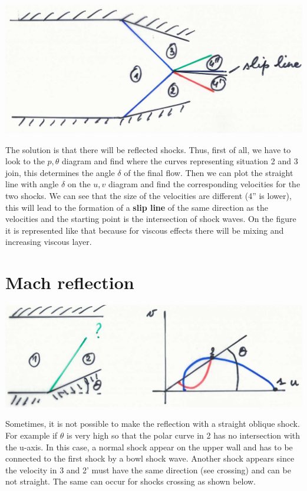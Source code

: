 \begin{center}
\begin{minipage}{0.35\textwidth}
\end{minipage}
\begin{minipage}{0.25\textwidth}
\includegraphics[scale=0.2]{ch9/12}
\end{minipage}
\end{center}

The solution is that there will be reflected shocks. Thus, first of all, we have to look to the $p,\theta$ diagram and find where the curves representing situation 2 and 3 join, this determines the angle $\delta$ of the final flow. Then we can plot the straight line with angle $\delta$ on the $u,v$ diagram and find the corresponding velocities for the two shocks. We can see that the size of the velocities are different (4'' is lower), this will lead to the formation of a \textbf{slip line} of the same direction as the velocities and the starting point is the intersection of shock waves. On the figure it is represented like that because for viscous effects there will be mixing and increasing viscous layer.  

\section{Mach reflection}
\begin{center}
\includegraphics[scale=0.2]{ch9/13}
\end{center}

Sometimes, it is not possible to make the reflection with a straight oblique shock. For example if $\theta$ is very high so that the polar curve in 2 has no intersection with the u-axis. In this case, a normal shock appear on the upper wall and has to be connected to the first shock by a bowl shock wave. Another shock appears since the velocity in 3 and 2' must have the same direction (see crossing) and can be not straight. The same can occur for shocks crossing as shown below.

